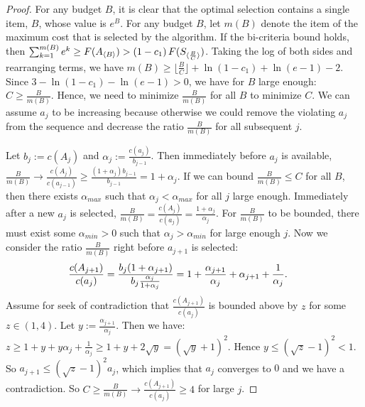 \begin{proof}
For any budget $B$, it is clear that the optimal selection contains
a single item, $B$, whose value is $e^B$. 
For any budget $B$, let $m(B)$ denote the item of the maximum cost that is selected by the algorithm.
If the bi-criteria bound holds, then 
$\sum _{k=1}^{m(B)} e^k \geq F(A_{\langle B \rangle}) > \left(1 - c_1\right) F(S_{\langle \frac{B}{C} \rangle})$. 
Taking the log of both sides and rearranging terms, we have $m(B) \geq \lfloor \frac{B}{C} \rfloor + \ln(1-c_1) + \ln(e-1) - 2$. 
Since $3 - \ln (1-c_1) - \ln (e-1) > 0$,  we have for $B$ large enough:
$C \geq \frac{B}{m(B)}. $ 
Hence, we need to minimize $\frac{B}{m(B)}$ for all $B$ to minimize $C$. We
can assume $a_j$ to be increasing 
because otherwise we could remove the violating $a_j$ 
from the sequence and decrease the ratio $\frac{B}{m(B)}$ for all subsequent $j$. 

Let $b_j := c(A_j)$ and $\alpha_{j} := \frac{c(a_{j})}{b_{j-1}}$. 
Then immediately before $a_{j}$ is available,
$\frac{B}{m(B)} \rightarrow 
\frac{c(A_j)}{c(a_{j-1})} \geq \frac{(1+\alpha_j)b_{j-1}}{b_{j-1}} = 1+\alpha_j$. If we can bound $\frac{B}{m(B)}\leq C$ for all $B$, 
then there exists $\alpha_{max}$ such that
$\alpha_j < \alpha_{max}$ for all $j$ large enough. 
Immediately after a new $a_j$ is selected, 
$\frac{B}{m(B)} = \frac{c(A_j)}{c(a_{j})} = \frac{1+\alpha_j}{\alpha_j}$. 
For $\frac{B}{m(B)}$ to be bounded, there must exist some $\alpha_{min}>0$ such that
$\alpha_j > \alpha_{min}$ for large enough $j$.
Now we consider the ratio $\frac{B}{m(B)}$ right before $a_{j+1}$ is selected:
\begin{align}
\hspace{-13pt} \frac{c(A_{j+1})}{c(a_{j})}= \frac{b_j(1+\alpha_{j+1})}{b_j\frac{\alpha_{j}}{1+\alpha_j}} =  
1 + \frac{\alpha_{j+1}}{\alpha_j} + \alpha_{j+1} + \frac{1}{\alpha_j}.
\label{line:lower_bound_cost_ratio}
\end{align}
Assume for seek of contradiction that $\frac{c(A_{j+1})}{c(a_{j})}$ 
is bounded above by $z$ for some $z \in (1,  4)$.
Let $y := \frac{\alpha_{j+1}}{\alpha_j}$. Then we have:
$ z \geq 1 + y + y\alpha_j + \frac{1}{\alpha_j} \geq 1 + y + 2\sqrt{y} = (\sqrt{y} + 1)^2$. Hence $y \leq (\sqrt{z} -1)^2 < 1$. 
So \mbox{$a_{j+1} \leq (\sqrt{z} -1)^2 a_j$}, which implies that $a_j$ converges to $0$ and we have a contradiction.
So \mbox{$C \geq \frac{B}{m(B)}  \rightarrow \frac{c(A_{j+1})}{c(a_{j})} \geq 4$} for large $j$.
\end{proof}

